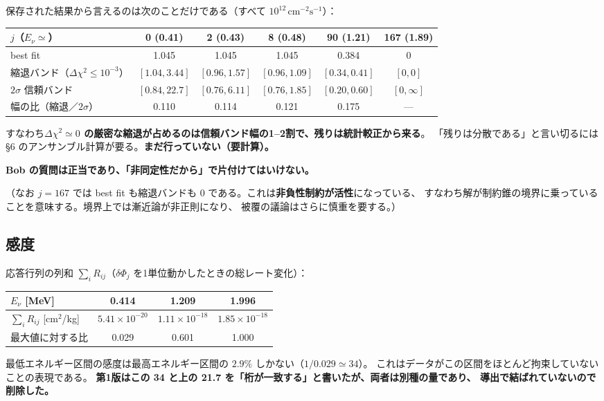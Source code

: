 \documentclass[11pt,a4paper]{ltjsarticle}
\newcommand{\dP}{\delta\Phi}
\newcommand{\Ev}{E_\nu}
\begin{document}
保存された結果から言えるのは次のことだけである（すべて $10^{12}\,\mathrm{cm^{-2}s^{-1}}$）：
\begin{center}\small
\begin{tabular}{lccccc}
\toprule
$j$（$\Ev\simeq$） & 0 (0.41) & 2 (0.43) & 8 (0.48) & 90 (1.21) & 167 (1.89)\\
\midrule
best fit & 1.045 & 1.045 & 1.045 & 0.384 & 0\\
縮退バンド（$\Delta\chi^2\le10^{-3}$）& $[1.04,3.44]$ & $[0.96,1.57]$ & $[0.96,1.09]$ & $[0.34,0.41]$ & $[0,0]$\\
$2\sigma$ 信頼バンド & $[0.84,22.7]$ & $[0.76,6.11]$ & $[0.76,1.85]$ & $[0.20,0.60]$ & $[0,\infty]$\\
\midrule
幅の比（縮退／$2\sigma$）& 0.110 & 0.114 & 0.121 & 0.175 & --- \\
\bottomrule
\end{tabular}
\end{center}
すなわち\textbf{$\Delta\chi^2\simeq0$ の厳密な縮退が占めるのは信頼バンド幅の1--2割で、残りは統計較正から来る}。
「残りは分散である」と言い切るには \S6 のアンサンブル計算が要る。\textbf{まだ行っていない（要計算）。}

\textbf{Bob の質問は正当であり、「非同定性だから」で片付けてはいけない。}

（なお $j=167$ では best fit も縮退バンドも $0$ である。これは\textbf{非負性制約が活性}になっている、
すなわち解が制約錐の境界に乗っていることを意味する。境界上では漸近論が非正則になり、
被覆の議論はさらに慎重を要する。）

\subsection{感度}
応答行列の列和 $\sum_i R_{ij}$（$\dP_j$ を1単位動かしたときの総レート変化）：
\begin{center}\small
\begin{tabular}{lccc}
\toprule
$\Ev$ [MeV] & 0.414 & 1.209 & 1.996 \\
\midrule
$\sum_i R_{ij}$ [cm$^2$/kg] & $5.41\times10^{-20}$ & $1.11\times10^{-18}$ & $1.85\times10^{-18}$\\
最大値に対する比 & 0.029 & 0.601 & 1.000\\
\bottomrule
\end{tabular}
\end{center}
最低エネルギー区間の感度は最高エネルギー区間の $2.9\%$ しかない（$1/0.029\simeq34$）。
これはデータがこの区間をほとんど拘束していないことの表現である。
\textbf{第1版はこの 34 と上の 21.7 を「桁が一致する」と書いたが、両者は別種の量であり、
導出で結ばれていないので削除した。}
\end{document}
